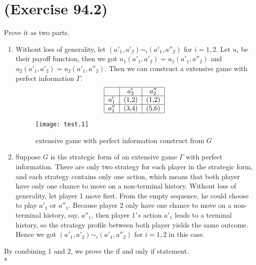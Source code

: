 \def\CTeXPreproc{Created by ctex v0.2.12, don't edit!}\documentclass[a4paper,12pt]{article}
\begin{document}
\section{(Exercise 94.2)}
Prove it as two parts.
\begin{enumerate}
\item
Without loss of generality, let $(a'_1,a'_2)\sim_i (a'_1,a''_2)$ for
$i=1,2$. Let $u_i$ be their payoff function, then we got
$u_1(a'_1,a'_2)=u_1(a'_1,a''_2)$ and
$u_2(a'_1,a'_2)=u_2(a'_1,a''_2)$. Then we can construct a extensive
game with perfect information $\Gamma$.
\[
    \begin{tabular}{|c|c|c|}
    \hline
            & $a'_2$ & $a''_2$ \\\hline
    $a'_1$  & (1,2) & (1,2) \\\hline
    $a''_1$ & (3,4) & (5,6) \\\hline
    \end{tabular}
\]

\begin{figure}
\begin{center}
\texttt{[image: test.1]}
\caption{extensive game with perfect information construct from $G$}
\label{fig:extgame}
\end{center}
\end{figure}

\item
Suppose $G$ is the strategic form of an extensive game $\Gamma$ with
perfect information. There are only two strategy for each player in
the strategic form, and each strategy contains only one action,
which means that both player have only one chance to move on a
non-terminal history. Without loss of generality, let player 1 move
first. From the empty sequence, he could choose to play $a'_1$ or
$a''_1$. Because player 2 only have one chance to move on a
non-terminal history, say, $a''_1$, then player $1's$ action $a'_1$
leads to a terminal history, so the strategy profile between both
player yields the same outcome. Hence we got $(a'_1,a'_2)\sim_i
(a'_1,a''_2)$ for $i=1,2$ in  this case.
\end{enumerate}
By combining 1 and 2, we prove the if and only if statement. \\*
\end{document}

